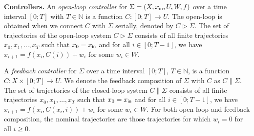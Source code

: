 %
%
%
%
%

\smallskip\noindent
\textbf{Controllers.} 
%
An \emph{open-loop controller} for $\Sigma=(X,x_{\mathsf{in}},U,W,f)$ over a time interval $[0;T]$ with $T\in\mathbb N$ 
is a function $C\colon [0;T]\to U$. 
The open-loop is obtained when we connect $C$ with $\Sigma$ serially,
 denoted by $C \triangleright \Sigma$. 
The set of trajectories of the open-loop system $C\triangleright\Sigma$ consists of all finite trajectories
$x_0, x_1, \ldots, x_T$ such that $x_0 = x_{\mathsf{in}}$ and for all $i \in [0; T-1]$, we have $x_{i+1} = f(x_i, C(i)) + w_i$ for some $w_i \in W$.

A \emph{feedback controller} for $\Sigma$ over a time interval $[0;T]$, $T\in \mathbb N$, 
is a function $C\colon X\times[0;T]\to U$. 
We denote the feedback composition of $\Sigma$ with $C$ as $C \parallel \Sigma$.
The set of trajectories of the closed-loop system $C\parallel\Sigma$ consists of all finite trajectories
$x_0, x_1, \ldots, x_T$ such that $x_0 = x_{\mathsf{in}}$ and for all $i \in [0; T-1]$, we have $x_{i+1} = f(x_i, C(x_i, i)) + w_i$ for some $w_i \in W$.
For both open-loop and feedback composition, the nominal trajectories are those trajectories for which $w_i = 0$ for all $i\geq 0$.

